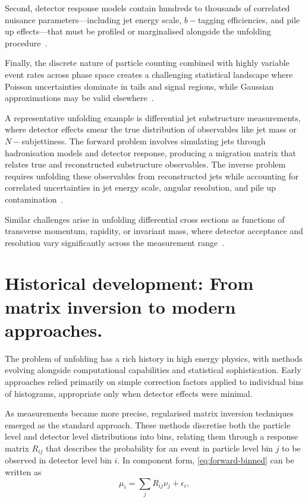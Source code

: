         Second, detector response models contain hundreds to thousands of correlated nuisance parameters—including jet energy scale, \(b-\)tagging efficiencies, and pile up effects—that must be profiled or marginalised alongside the unfolding procedure~\cite{zhu2024multidimensional, Dorigo2020DealingReview, cranmer_histfactory_2012, ke_recent_2023}.

        Finally, the discrete nature of particle counting combined with highly variable event rates across phase space creates a challenging statistical landscape where Poisson uncertainties dominate in tails and signal regions, while Gaussian approximations may be valid elsewhere~\cite{kuusela_shape-constrained_2017, conrad_including_2003, giovanni_multi-dimensional_2010, from_new_2020}.

        A representative unfolding example is differential jet substructure measurements, where detector effects smear the true distribution of observables like jet mass or \(N-\)subjettiness.
        The forward problem involves simulating jets through hadronisation models and detector response, producing a migration matrix that relates true and reconstructed substructure observables.
        The inverse problem requires unfolding these observables from reconstructed jets while accounting for correlated uncertainties in jet energy scale, angular resolution, and pile up contamination~\cite{zardoshti_investigating_2017}.

        Similar challenges arise in unfolding differential cross sections as functions of transverse momentum, rapidity, or invariant mass, where detector acceptance and resolution vary significantly across the measurement range~\cite{gardi_statistics_2015}.
\section{Historical development: From matrix inversion to modern approaches.}
\label{sec:ill-posed}
    The problem of unfolding has a rich history in high energy physics, with methods evolving alongside computational capabilities and statistical sophistication.
    Early approaches relied primarily on simple correction factors applied to individual bins of histograms, appropriate only when detector effects were minimal.

    As measurements became more precise, regularised matrix inversion techniques emerged as the standard approach.
    These methods discretise both the particle level and detector level distributions into bins, relating them through a response matrix \({R}_{ij}\) that describes the probability for an event in particle level bin \(j\) to be observed in detector level bin \(i\).
    In component form, \cref{eq:forward-binned} can be written as
    \begin{equation}
        \mu_i = \sum_j R_{ij} \nu_{j} + \epsilon_i,
    \end{equation}

